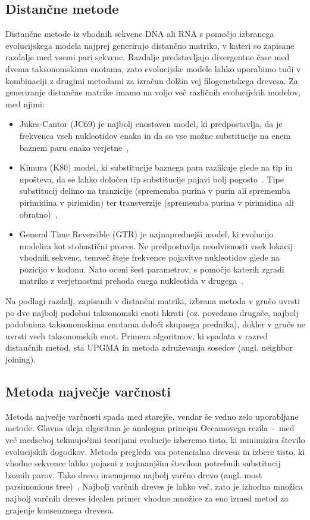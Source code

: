 \documentclass[a4paper, 12pt]{book}
\begin{document}
\subsection{Distančne metode}
Distančne metode iz vhodnih sekvenc DNA ali RNA s pomočjo izbranega evolucijskega modela najprej generirajo distančno matriko, v kateri so zapisane razdalje med vsemi pari sekvenc. Razdalje predstavljajo divergentne čase med dvema taksonomskima enotama, zato evolucijske modele lahko uporabimo tudi v kombinaciji z drugimi metodami za izračun dolžin vej filogenetskega drevesa. Za generiranje distančne matrike imamo na voljo več različnih evolucijskih modelov, med njimi:
	\begin{itemize}
		\item Jukes-Cantor (JC69) je najbolj enostaven model, ki predpostavlja, da je frekvenca vseh nukleotidov enaka in da so vse možne substitucije na enem baznem paru enako verjetne~\cite{jc},
		\item Kimura (K80) model, ki substitucije baznega para razlikuje glede na tip in upošteva, da se lahko določen tip substitucije pojavi bolj pogosto~\cite{k80}. Tipe substitucij delimo na tranzicije (sprememba purina v purin ali sprememba pirimidina v pirimidin) ter transverzije (sprememba purina v pirimidina ali obratno)~\cite{fel},
		\item General Time Reversible (GTR) je najnaprednejši model, ki evolucijo modelira kot stohastični proces. Ne predpostavlja neodvisnosti vsek lokacij vhodnih sekvenc, temveč šteje frekvence pojavitve nukleotidov glede na pozicijo v kodonu. Nato oceni šest parametrov, s pomočjo katerih zgradi matriko z verjetnostmi prehoda enega nukleotida v drugega~\cite{gtr}.
	\end{itemize}

Na podlagi razdalj, zapisanih v distančni matriki, izbrana metoda v gručo uvrsti po dve najbolj podobni taksonomski enoti hkrati (oz. povedano drugače, najbolj podobnima taksonomskima enotama določi skupnega prednika), dokler v gruče ne uvrsti vseh taksonomskih enot. Primera algoritmov, ki spadata v razred distančnih metod, sta UPGMA in metoda združevanja sosedov (angl. neighbor joining). 

\subsection{Metoda največje varčnosti}
Metoda največje varčnosti spada med starejše, vendar še vedno zelo uporabljane metode. Glavna ideja algoritma je analogna principu Occamovega rezila~-~med več medseboj tekmujočimi teorijami evolucije izberemo tisto, ki minimizira število evolucijskih dogodkov. Metoda pregleda vsa potencialna drevesa in izbere tisto, ki vhodne sekvence lahko pojasni z najmanjšim številom potrebnih substitucij baznih parov. Tako drevo imenujemo najbolj varčno drevo (angl. most parsimonious tree)~\cite{parsimony}. Najbolj varčnih dreves je lahko več, zato je izhodna množica najbolj varčnih dreves idealen primer vhodne množice za eno izmed metod za grajenje konsenznega drevesa.
\end{document}
